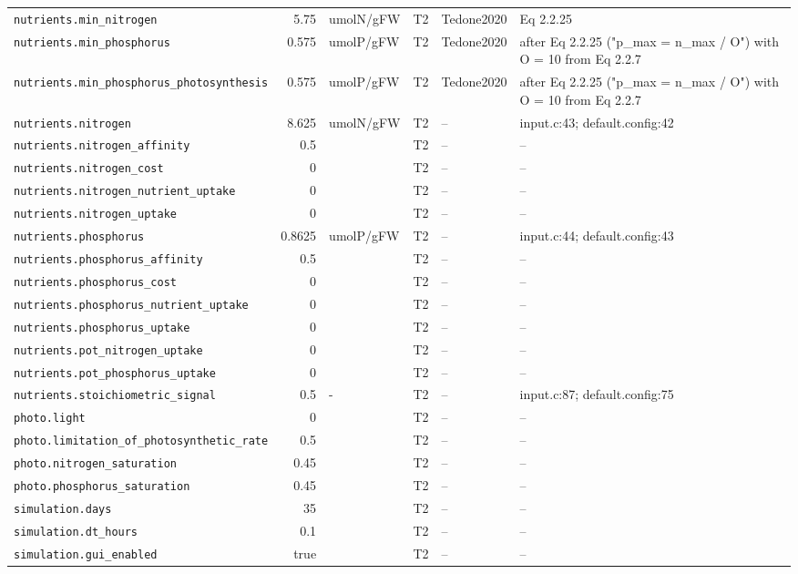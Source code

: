 \documentclass[a4paper,11pt]{article}
\begin{document}
\begin{table}[!htbp]
\begin{tabular}{@{}p{52mm}rp{20mm}cp{20mm}p{38mm}@{}}
\texttt{nutrients.min\_nitrogen} & 5.75 & umolN/gFW & T2 & Tedone2020 & Eq 2.2.25 \\
\texttt{nutrients.min\_phosphorus} & 0.575 & umolP/gFW & T2 & Tedone2020 & after Eq 2.2.25 ("p\_max = n\_max / O") with O = 10 from Eq 2.2.7 \\
\texttt{nutrients.min\_phosphorus\_photosynthesis} & 0.575 & umolP/gFW & T2 & Tedone2020 & after Eq 2.2.25 ("p\_max = n\_max / O") with O = 10 from Eq 2.2.7 \\
\texttt{nutrients.nitrogen} & 8.625 & umolN/gFW & T2 & -- & input.c:43; default.config:42 \\
\texttt{nutrients.nitrogen\_affinity} & 0.5 &  & T2 & -- & -- \\
\texttt{nutrients.nitrogen\_cost} & 0 &  & T2 & -- & -- \\
\texttt{nutrients.nitrogen\_nutrient\_uptake} & 0 &  & T2 & -- & -- \\
\texttt{nutrients.nitrogen\_uptake} & 0 &  & T2 & -- & -- \\
\texttt{nutrients.phosphorus} & 0.8625 & umolP/gFW & T2 & -- & input.c:44; default.config:43 \\
\texttt{nutrients.phosphorus\_affinity} & 0.5 &  & T2 & -- & -- \\
\texttt{nutrients.phosphorus\_cost} & 0 &  & T2 & -- & -- \\
\texttt{nutrients.phosphorus\_nutrient\_uptake} & 0 &  & T2 & -- & -- \\
\texttt{nutrients.phosphorus\_uptake} & 0 &  & T2 & -- & -- \\
\texttt{nutrients.pot\_nitrogen\_uptake} & 0 &  & T2 & -- & -- \\
\texttt{nutrients.pot\_phosphorus\_uptake} & 0 &  & T2 & -- & -- \\
\texttt{nutrients.stoichiometric\_signal} & 0.5 & - & T2 & -- & input.c:87; default.config:75 \\
\texttt{photo.light} & 0 &  & T2 & -- & -- \\
\texttt{photo.limitation\_of\_photosynthetic\_rate} & 0.5 &  & T2 & -- & -- \\
\texttt{photo.nitrogen\_saturation} & 0.45 &  & T2 & -- & -- \\
\texttt{photo.phosphorus\_saturation} & 0.45 &  & T2 & -- & -- \\
\texttt{simulation.days} & 35 &  & T2 & -- & -- \\
\texttt{simulation.dt\_hours} & 0.1 &  & T2 & -- & -- \\
\texttt{simulation.gui\_enabled} & true &  & T2 & -- & -- \\

\end{tabular}
\end{table}
\end{document}
